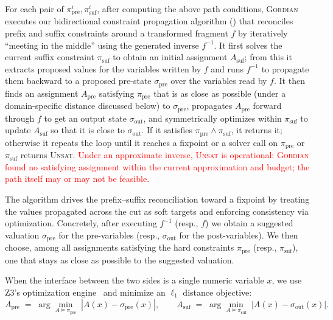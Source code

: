 \documentclass[acmsmall]{acmart}
\newcommand{\rev}[1]{\textcolor{red}{#1}}
\newcommand{\rev}[1]{#1}
\newcommand{\projName}{\textsc{Gordian}\xspace}
\theoremstyle{definition}
\begin{document}
For each pair of $\pi_\mathrm{pre}^i, \pi_\mathrm{suf}^i$, after computing the above path conditions, \projName executes our bidirectional constraint propagation algorithm () that reconciles prefix and suffix constraints around a transformed fragment \(f\) by iteratively ``meeting in the middle'' using the generated inverse \(f^{-1}\). It first solves the current suffix constraint \(\pi_{\mathrm{suf}}\) to obtain an initial assignment \(A_{\mathrm{suf}}\); from this it extracts proposed values for the variables written by \(f\) and runs \(f^{-1}\) to propagate them backward to a proposed pre-state \(\sigma_{\mathrm{pre}}\) over the variables read by \(f\). It then finds an assignment \(A_{\mathrm{pre}}\) satisfying \(\pi_{\mathrm{pre}}\) that is as close as possible (under a domain-specific distance discussed below) to \(\sigma_{\mathrm{pre}}\), propagates \(A_{\mathrm{pre}}\) forward through \(f\) to get an output state \(\sigma_{\mathrm{out}}\), and symmetrically optimizes within \(\pi_{\mathrm{suf}}\) to update \(A_{\mathrm{suf}}\) so that it is close to \(\sigma_{\mathrm{out}}\). If it satisfies \(\pi_{\mathrm{pre}}\wedge\pi_{\mathrm{suf}}\), it returns it; otherwise it repeats the loop until it reaches a fixpoint or a solver call on \(\pi_{\mathrm{pre}}\) or \(\pi_{\mathrm{suf}}\) returns \textsc{Unsat}. 
\rev{Under an approximate inverse, \textsc{Unsat} is operational: \projName{} found no satisfying assignment within the current approximation and budget; the path itself may or may not be feasible.}

The algorithm drives the prefix--suffix reconciliation toward a fixpoint by treating the values propagated across the cut as soft targets and enforcing consistency via optimization. Concretely, after executing \(f^{-1}\) (resp., \(f\)) we obtain a suggested valuation \(\sigma_{\mathrm{pre}}\) for the pre-variables (resp., \(\sigma_{\mathrm{out}}\) for the post-variables). We then choose, among all assignments satisfying the hard constraints \(\pi_{\mathrm{pre}}\) (resp., \(\pi_{\mathrm{suf}}\)), one that stays as close as possible to the suggested valuation.


When the interface between the two sides is a single numeric variable \(x\), we use Z3’s optimization engine~\cite{bjorner2015nuz} and minimize an \(\ell_1\) distance objective:
\[
A_{\mathrm{pre}} \;=\; \arg\min_{A \models \pi_{\mathrm{pre}}}\; |A(x)-\sigma_{\mathrm{pre}}(x)|,
\qquad
A_{\mathrm{suf}} \;=\; \arg\min_{A \models \pi_{\mathrm{suf}}}\; |A(x)-\sigma_{\mathrm{out}}(x)|.
\]
\end{document}
